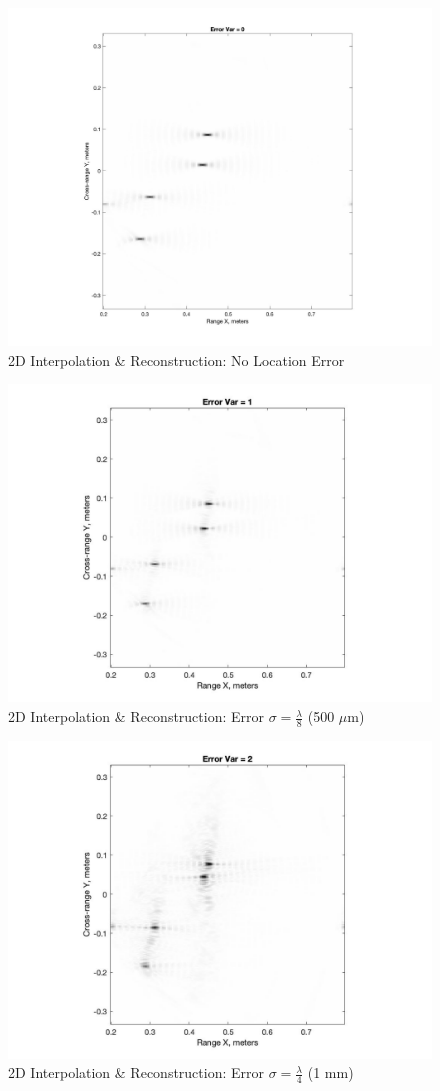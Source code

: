 \documentclass{article}
\begin{document}
\begin{figure}[h!]
    \centering
    \includegraphics[width=.6\textwidth]{Figures/2dvar0.jpg}
    \caption{2D Interpolation \& Reconstruction: No Location Error}
        \label{2dvar0}
\end{figure}
\begin{figure}[h!]
    \centering
    \includegraphics[width=.6\linewidth]{Figures/2dvar1.jpg}
    \caption{2D Interpolation \& Reconstruction: Error $\sigma=\frac{\lambda}{8}$ (500 $\mu${m})}
    \label{2dvar1}
\end{figure}
\begin{figure}[h!]
    \centering
    \includegraphics[width=.6\linewidth]{Figures/2dvar2.jpg}
    \caption{2D Interpolation \& Reconstruction: Error $\sigma=\frac{\lambda}{4}$ (1 mm)}
    \label{2dvar2}
\end{figure}
\end{document}
